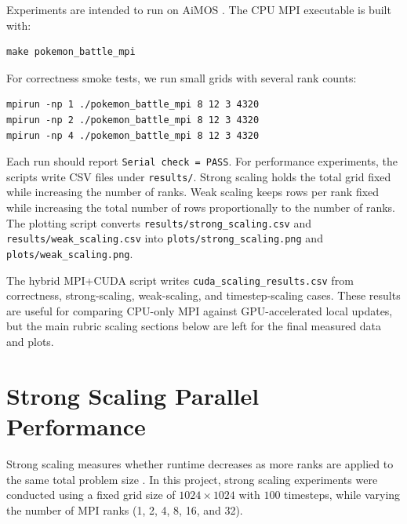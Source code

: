 \documentclass[10pt,twocolumn]{article}
\begin{document}
Experiments are intended to run on AiMOS \cite{aimos, foci}. The CPU MPI executable is built with:

\begin{lstlisting}
make pokemon_battle_mpi
\end{lstlisting}

For correctness smoke tests, we run small grids with several rank counts:

\begin{lstlisting}
mpirun -np 1 ./pokemon_battle_mpi 8 12 3 4320
mpirun -np 2 ./pokemon_battle_mpi 8 12 3 4320
mpirun -np 4 ./pokemon_battle_mpi 8 12 3 4320
\end{lstlisting}

Each run should report \texttt{Serial check = PASS}. For performance experiments, the scripts write CSV files under \texttt{results/}. Strong scaling holds the total grid fixed while increasing the number of ranks. Weak scaling keeps rows per rank fixed while increasing the total number of rows proportionally to the number of ranks. The plotting script converts \texttt{results/strong\_scaling.csv} and \texttt{results/weak\_scaling.csv} into \texttt{plots/strong\_scaling.png} and \texttt{plots/weak\_scaling.png}.

The hybrid MPI+CUDA script writes \texttt{cuda\_scaling\_results.csv} from correctness, strong-scaling, weak-scaling, and timestep-scaling cases. These results are useful for comparing CPU-only MPI against GPU-accelerated local updates, but the main rubric scaling sections below are left for the final measured data and plots.

\section*{Strong Scaling Parallel Performance}

Strong scaling measures whether runtime decreases as more ranks are applied to the same total problem size \cite{llnlmpi}. In this project, strong scaling experiments were conducted using a fixed grid size of $1024 \times 1024$ with $100$ timesteps, while varying the number of MPI ranks (1, 2, 4, 8, 16, and 32).

\begin{table}[!tbp]
\centering
{}
\caption{Strong scaling results for MPI only on 1024 $\times$ 1024 grid over 100 timesteps.}
\end{table}
\end{document}
